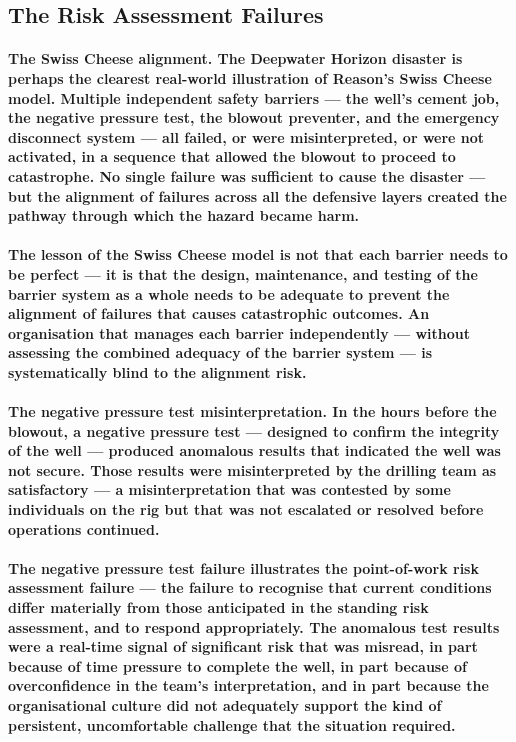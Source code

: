 \subsection{The Risk Assessment Failures}
\paragraph{\textbf{The Swiss Cheese alignment}. The Deepwater Horizon disaster is perhaps the clearest real-world illustration of Reason's Swiss Cheese model. Multiple independent safety barriers — the well's cement job, the negative pressure test, the blowout preventer, and the emergency disconnect system — all failed, or were misinterpreted, or were not activated, in a sequence that allowed the blowout to proceed to catastrophe. No single failure was sufficient to cause the disaster — but the alignment of failures across all the defensive layers created the pathway through which the hazard became harm.}
\paragraph{The lesson of the Swiss Cheese model is not that each barrier needs to be perfect — it is that the design, maintenance, and testing of the barrier system as a whole needs to be adequate to prevent the alignment of failures that causes catastrophic outcomes. An organisation that manages each barrier independently — without assessing the combined adequacy of the barrier system — is systematically blind to the alignment risk.}
\paragraph{\textbf{The negative pressure test misinterpretation}. In the hours before the blowout, a negative pressure test — designed to confirm the integrity of the well — produced anomalous results that indicated the well was not secure. Those results were misinterpreted by the drilling team as satisfactory — a misinterpretation that was contested by some individuals on the rig but that was not escalated or resolved before operations continued.}
\paragraph{The negative pressure test failure illustrates the point-of-work risk assessment failure — the failure to recognise that current conditions differ materially from those anticipated in the standing risk assessment, and to respond appropriately. The anomalous test results were a real-time signal of significant risk that was misread, in part because of time pressure to complete the well, in part because of overconfidence in the team's interpretation, and in part because the organisational culture did not adequately support the kind of persistent, uncomfortable challenge that the situation required.}
